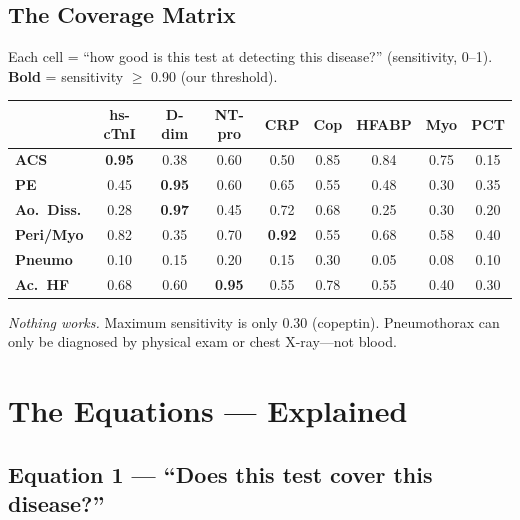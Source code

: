 \documentclass[11pt,a4paper]{article}
\begin{document}
\subsection{The Coverage Matrix}

Each cell = ``how good is this test at detecting this disease?'' (sensitivity,
0--1). \textbf{Bold} = sensitivity $\geq$ 0.90 (our threshold).

\begin{table}[h]
\centering\small
\setlength{\tabcolsep}{4pt}
\begin{tabular}{@{}l*{8}{c}@{}}
\toprule
 & \textbf{hs-cTnI} & \textbf{D-dim} & \textbf{NT-pro} & \textbf{CRP}
 & \textbf{Cop} & \textbf{HFABP} & \textbf{Myo} & \textbf{PCT} \\
\midrule
\textbf{ACS}      & \cellcolor{success!20}\textbf{0.95} & 0.38 & 0.60 & 0.50 & 0.85 & 0.84 & 0.75 & 0.15 \\
\textbf{PE}       & 0.45 & \cellcolor{success!20}\textbf{0.95} & 0.60 & 0.65 & 0.55 & 0.48 & 0.30 & 0.35 \\
\textbf{Ao.\ Diss.} & 0.28 & \cellcolor{success!20}\textbf{0.97} & 0.45 & 0.72 & 0.68 & 0.25 & 0.30 & 0.20 \\
\textbf{Peri/Myo} & 0.82 & 0.35 & 0.70 & \cellcolor{success!20}\textbf{0.92} & 0.55 & 0.68 & 0.58 & 0.40 \\
\rowcolor{alert!10}
\textbf{Pneumo}   & 0.10 & 0.15 & 0.20 & 0.15 & 0.30 & 0.05 & 0.08 & 0.10 \\
\textbf{Ac.\ HF}  & 0.68 & 0.60 & \cellcolor{success!20}\textbf{0.95} & 0.55 & 0.78 & 0.55 & 0.40 & 0.30 \\
\bottomrule
\end{tabular}
\end{table}

\begin{tcolorbox}[alertbox, title={Pneumothorax row}]
\emph{Nothing works.} Maximum sensitivity is only 0.30 (copeptin).
Pneumothorax can only be diagnosed by physical exam or chest X-ray---not blood.
\end{tcolorbox}


\section{The Equations --- Explained}

\subsection{Equation 1 --- ``Does this test cover this disease?''}
\end{document}
